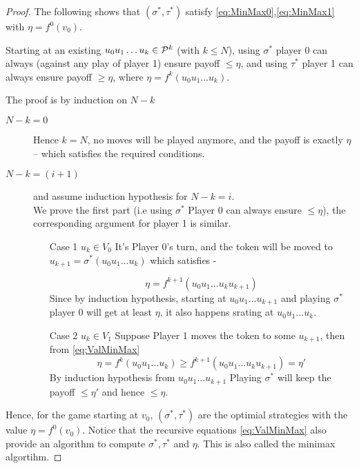 \begin{proof}
The following shows that $(\sigma^*,\tau^*)$ satisfy \eqref{eq:MinMax0},\eqref{eq:MinMax1} with $\eta = f^0(v_0)$.

\begin{claim}
    Starting at an existing $u_0u_1\ldots u_k \in \PF[k]$ (with $k \leq N$), using $\sigma^*$ player 0 can always (against any play of player 1) ensure payoff $\leq \eta$, and using $\tau^*$ player 1 can always ensure payoff $\geq \eta$, where $\eta = f^k(u_0u_1\ldots u_k)$.
\end{claim}
\begin{claimproof}
    The proof is by induction on $N-k$
    \begin{description}
        \item[$N-k=0$] Hence $k=N$, no moves will be played anymore, and the payoff is exactly $\eta$ -- which satisfies the required conditions. 
        \item[$N - k = (i+1)$] and assume induction hypothesis for $N-k=i$.\\
            We prove the first part (i.e using $\sigma^*$ Player 0 can always ensure $\leq \eta$), the corresponding argument for player 1 is similar.
            \begin{itemize}
                \item[Case 1] $u_k \in V_0$ It's Player 0's turn, and the token will be moved to $ u_{k+1} = \sigma^*(u_0u_1\ldots u_k)$ which satisfies -

                    \[
                        \eta = f^{k+1}(u_0 u_1 \ldots u_k u_{k+1})
                    \]
                    Since by induction hypothesis, starting at $u_0 u_1 \ldots u_{k+1}$ and playing $\sigma^*$ player 0 will get at least $\eta$, it also happens srating at $u_0 u_1 \ldots u_{k}$.
                \item[Case 2] $u_k \in V_1$ Suppose Player 1 moves the token to some $u_{k+1}$, then from \eqref{eq:ValMinMax}
                    \[
                        \eta = f^k(u_0 u_1 \ldots u_k) \geq f^{k+1}(u_0 u_1 \ldots u_k u_{k+1}) = \eta'
                    \]
                    By induction hypothesis from $u_0 u_1 \ldots u_{k+1}$ Playing $\sigma^*$ will keep the payoff $\leq \eta'$ and hence $\leq \eta$.
            \end{itemize}
    \end{description}
\end{claimproof}

Hence, for the game starting at $v_0$, $(\sigma^*, \tau^*)$ are the optimial strategies with the value $\eta = f^0(v_0)$. Notice that the recursive equations \eqref{eq:ValMinMax} also provide an algorithm to compute $\sigma^*, \tau^*$ and $\eta$. This is also called the minimax algortihm.
\end{proof}

